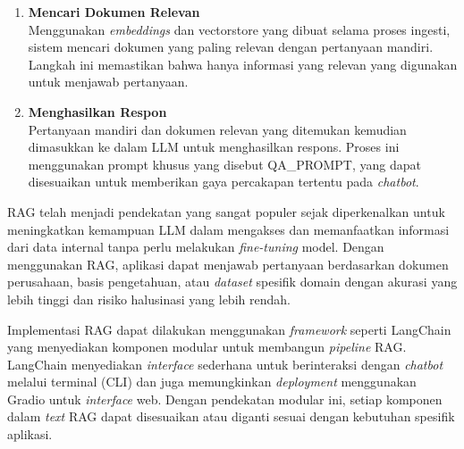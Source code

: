 \begin{enumerate}
\begin{enumerate}
    \item \textbf{Mencari Dokumen Relevan} \\
    Menggunakan \textit{embeddings} dan vectorstore yang dibuat selama proses ingesti, sistem mencari dokumen yang paling relevan dengan pertanyaan mandiri. Langkah ini memastikan bahwa hanya informasi yang relevan yang digunakan untuk menjawab pertanyaan.
    \item \textbf{Menghasilkan Respon} \\
    Pertanyaan mandiri dan dokumen relevan yang ditemukan kemudian dimasukkan ke dalam LLM untuk menghasilkan respons. Proses ini menggunakan prompt khusus yang disebut QA\_PROMPT, yang dapat disesuaikan untuk memberikan gaya percakapan tertentu pada \textit{chatbot}.
  \end{enumerate}
\end{enumerate}

RAG telah menjadi pendekatan yang sangat populer sejak diperkenalkan untuk meningkatkan kemampuan LLM dalam mengakses dan memanfaatkan informasi dari data internal tanpa perlu melakukan \textit{fine-tuning} model. Dengan menggunakan RAG, aplikasi dapat menjawab pertanyaan berdasarkan dokumen perusahaan, basis pengetahuan, atau \textit{dataset} spesifik domain dengan akurasi yang lebih tinggi dan risiko halusinasi yang lebih rendah.

Implementasi RAG dapat dilakukan menggunakan \textit{framework} seperti LangChain yang menyediakan komponen modular untuk membangun \textit{pipeline} RAG. LangChain menyediakan \textit{interface} sederhana untuk berinteraksi dengan \textit{chatbot} melalui terminal (CLI) dan juga memungkinkan \textit{deployment} menggunakan Gradio untuk \textit{interface} web. Dengan pendekatan modular ini, setiap komponen dalam \textit{text} RAG dapat disesuaikan atau diganti sesuai dengan kebutuhan spesifik aplikasi.

